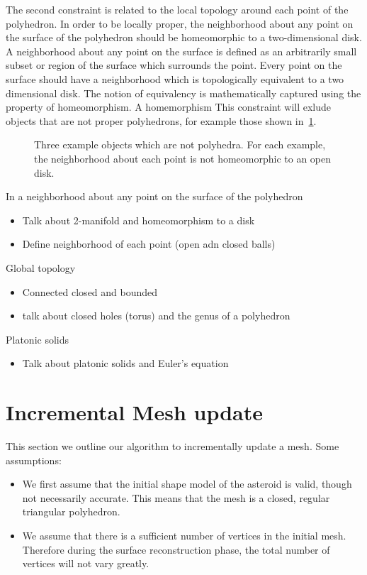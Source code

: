 The second constraint is related to the local topology around each point of the polyhedron.
In order to be locally proper, the neighborhood about any point on the surface of the polyhedron should be homeomorphic to a two-dimensional disk.
A neighborhood about any point on the surface is defined as an arbitrarily small subset or region of the surface which surrounds the point.
Every point on the surface should have a neighborhood which is topologically equivalent to a two dimensional disk.
The notion of equivalency is mathematically captured using the property of homeomorphism.
A homemorphism
This constraint will exlude objects that are not proper polyhedrons, for example those shown in~\cref{fig:improper_polyhedrons}.
\begin{figure}[h]
    \centering
    \caption{Three example objects which are not polyhedra. For each example, the neighborhood about each point is not homeomorphic to an open disk.~\label{fig:improper_polyhedrons}}
\end{figure}
In a neighborhood about any point on the surface of the polyhedron 
\begin{itemize}
    \item Talk about 2-manifold and homeomorphism to a disk
    \item Define neighborhood of each point (open adn closed balls)
\end{itemize}

Global topology
\begin{itemize}
    \item Connected closed and bounded
    \item talk about closed holes (torus) and the genus of a polyhedron
\end{itemize}

Platonic solids
\begin{itemize}
    \item Talk about platonic solids and Euler's equation
\end{itemize}
\section{Incremental Mesh update}

This section we outline our algorithm to incrementally update a mesh. 
Some assumptions:

\begin{itemize}
    \item We first assume that the initial shape model of the asteroid is valid, though not necessarily accurate.
        This means that the mesh is a closed, regular triangular polyhedron.
    \item We assume that there is a sufficient number of vertices in the initial mesh. 
        Therefore during the surface reconstruction phase, the total number of vertices will not vary greatly.
\end{itemize}

